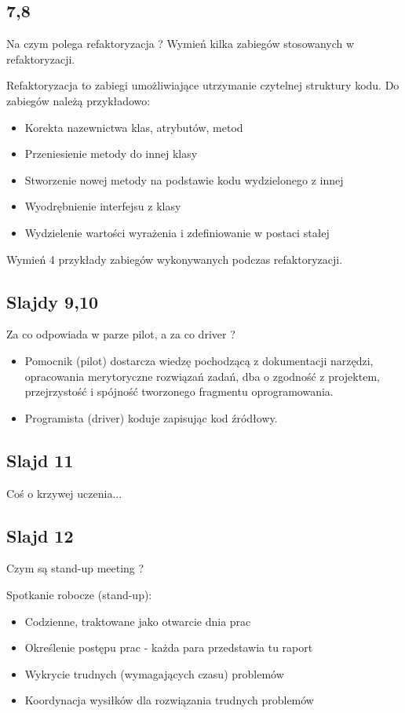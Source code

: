 \documentclass[a4paper,15pt]{article}
\newcommand{\question}[2]{
    \begin{tcolorbox}[colback=mRed!5!white,colframe=mRed,title={Kolokwium 2018 #1}]
        #2
    \end{tcolorbox}
}
\begin{document}
\subsection{7,8}
\begin{framed}
Na czym polega refaktoryzacja ? Wymień kilka zabiegów stosowanych w refaktoryzacji.
\end{framed}
Refaktoryzacja to zabiegi umożliwiające utrzymanie czytelnej struktury kodu. Do zabiegów należą przykładowo:
\begin{itemize}
\item Korekta nazewnictwa klas, atrybutów, metod
\item Przeniesienie metody do innej klasy
\item Stworzenie nowej metody na podstawie kodu wydzielonego z innej
\item Wyodrębnienie interfejsu z klasy
\item Wydzielenie wartości wyrażenia i zdefiniowanie w postaci stałej
\end{itemize}

\question{}{
Wymień 4 przykłady zabiegów wykonywanych podczas refaktoryzacji. 
}


\subsection{Slajdy 9,10}
\begin{framed}
Za co odpowiada w parze pilot, a za co driver ?
\end{framed}
\begin{itemize}
\item Pomocnik (pilot) dostarcza wiedzę pochodzącą z dokumentacji narzędzi, opracowania merytoryczne rozwiązań zadań, dba o zgodność z projektem, przejrzystość i spójność tworzonego fragmentu oprogramowania.
\item Programista (driver) koduje zapisując kod źródłowy.
\end{itemize}

\subsection{Slajd 11}
Coś o krzywej uczenia...

\subsection{Slajd 12}
\begin{framed}
Czym są stand-up meeting ?
\end{framed}
Spotkanie robocze (stand-up):
\begin{itemize}
\item Codzienne, traktowane jako otwarcie dnia prac
\item Określenie postępu prac - każda para przedstawia tu raport
\item Wykrycie trudnych (wymagających czasu) problemów
\item Koordynacja wysiłków dla rozwiązania trudnych problemów
\end{itemize}
\end{document}
